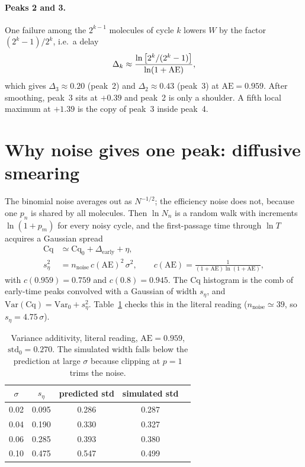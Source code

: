 \documentclass[11pt]{article}
\newcommand{\AEf}{\mathrm{AE}}
\newcommand{\Cq}{\mathrm{Cq}}
\begin{document}
\paragraph{Peaks 2 and 3.} One failure among the $2^{k-1}$ molecules of cycle $k$ lowers $W$ by
the factor $(2^k-1)/2^k$, i.e.\ a delay
\begin{equation}
    \Delta_k \approx \frac{\ln\br{2^k/(2^k-1)}}{\ln(1+\AEf)} ,
\end{equation}
which gives $\Delta_3\approx0.20$ (peak~2) and $\Delta_2\approx0.43$ (peak~3) at $\AEf=0.959$.
After smoothing, peak~3 sits at $+0.39$ and peak~2 is only a shoulder. A fifth local
maximum at $+1.39$ is the copy of peak~3 inside peak~4.

\section{Why noise gives one peak: diffusive smearing}

The binomial noise averages out as $N^{-1/2}$; the efficiency noise does not, because one
$p_n$ is shared by all molecules. Then $\ln N_n$ is a random walk with increments $\ln(1+p_m)$
for every noisy cycle, and the first-passage time through $\ln T$ acquires a Gaussian spread
\begin{equation}
\begin{aligned}
    \Cq &\simeq \Cq_0 + \Delta_{\text{early}} + \eta, \\
    s_\eta^2 &= n_\text{noise}\,c(\AEf)^2\,\sigma^2, \qquad c(\AEf)=\frac{1}{(1+\AEf)\ln(1+\AEf)},
\end{aligned}
\label{eq:seta}
\end{equation}
with $c(0.959)=0.759$ and $c(0.8)=0.945$. The Cq histogram is the comb of early-time peaks
convolved with a Gaussian of width $s_\eta$, and $\mathrm{Var}(\Cq)=\mathrm{Var}_0+s_\eta^2$.
Table~\ref{tab:var} checks this in the literal reading ($n_\text{noise}\simeq39$, so
$s_\eta=4.75\,\sigma$).

\begin{table}[htbp]
\centering
\begin{tabular}{@{}ccccc@{}}
\toprule
$\sigma$ & $s_\eta$ & predicted std & simulated std \\
\midrule
0.02 & 0.095 & 0.286 & 0.287 \\
0.04 & 0.190 & 0.330 & 0.327 \\
0.06 & 0.285 & 0.393 & 0.380 \\
0.10 & 0.475 & 0.547 & 0.499 \\
\bottomrule
\end{tabular}
\caption{Variance additivity, literal reading, $\AEf=0.959$, $\mathrm{std}_0=0.270$. The
simulated width falls below the prediction at large $\sigma$ because clipping at $p=1$ trims
the noise.}
\label{tab:var}
\end{table}
\end{document}
